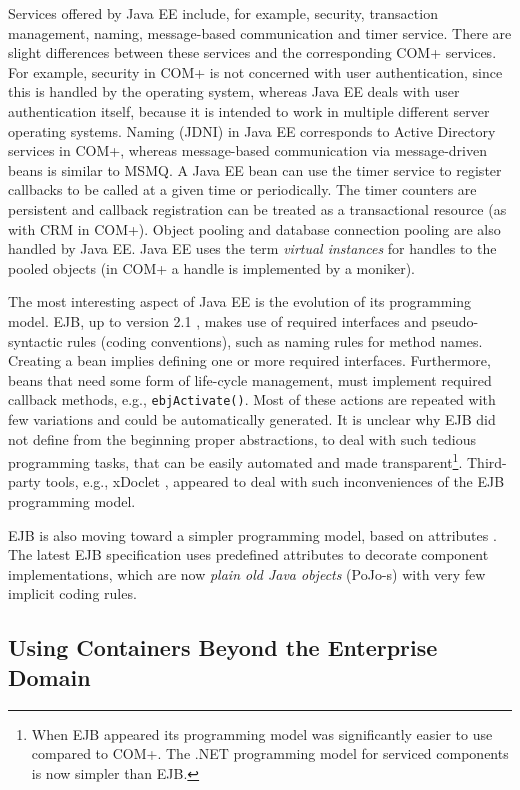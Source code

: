 Services offered by Java EE include, for example, security, transaction management, naming, message-based communication and timer service. There are slight differences between these services and the corresponding COM+ services. For example, security in COM+ is not concerned with user authentication, since this is handled by the operating system, whereas Java EE deals with user authentication itself, because it is intended to work in multiple different server operating systems.
Naming (JDNI) in Java EE corresponds to Active Directory services in COM+, whereas message-based communication via message-driven beans is similar to MSMQ. A Java EE bean can use the timer service to register callbacks to be called at a given time or periodically. The timer counters are persistent and callback registration can be treated as a transactional resource (as with CRM in COM+). Object pooling and database connection pooling are also handled by Java EE. Java EE uses the term \textit{virtual instances} \cite{server.patterns.02} for handles to the pooled objects (in COM+ a handle is implemented by a moniker).

The most interesting aspect of Java EE is the evolution of its programming model. EJB, up to version 2.1 \cite{ejb21}, makes use of required interfaces and pseudo-syntactic rules (coding conventions), such as naming rules for method names. Creating a bean implies defining one or more required interfaces. Furthermore, beans that need some form of life-cycle management, must implement required callback methods, e.g., \texttt{ebjActivate()}. Most of these actions are repeated with few variations and could be automatically generated. It is unclear why EJB did not define from the beginning proper abstractions, to deal with such tedious programming tasks, that can be easily automated and made transparent\footnote{When EJB appeared its programming model was significantly easier to use compared to COM+. The .NET programming model for serviced components is now simpler than EJB.}. Third-party tools, e.g., xDoclet \cite{www.xDoclet}, appeared to deal with such inconveniences of the EJB programming model.

EJB is also moving toward a simpler programming model, based on attributes \cite{java.explicit.programming}. The latest EJB specification \cite{ejb30} uses predefined attributes to decorate component implementations, which are now \textit{plain old Java objects} (PoJo-s) with very few implicit coding rules.

\subsection{Using Containers Beyond the Enterprise Domain}
\label{c2.container.domain}

